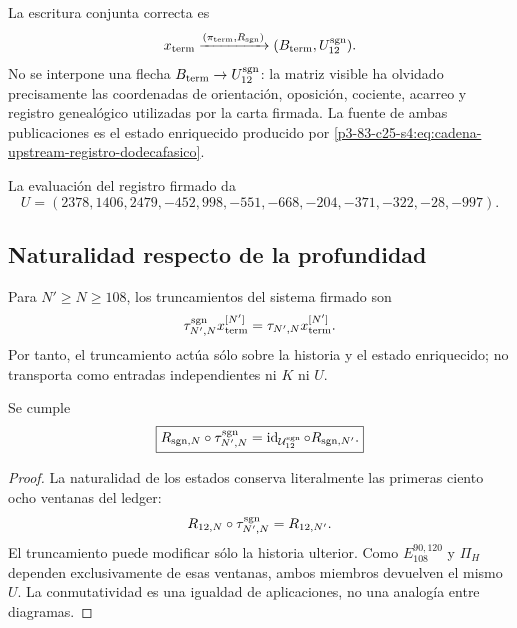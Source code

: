 La escritura conjunta correcta es
\begin{equation}
 x_{\rm term}
 \xrightarrow{(\pi_{\rm term},R_{\rm sgn})}
 (B_{\rm term},U_{12}^{\rm sgn}).
 \label{p3-83-c25-s4:eq:doble-publicacion-terminal}
\end{equation}
No se interpone una flecha
\(B_{\rm term}\to U_{12}^{\rm sgn}\): la matriz visible ha olvidado
precisamente las coordenadas de orientación, oposición, cociente, acarreo y
registro genealógico utilizadas por la carta firmada. La fuente de ambas publicaciones es
el estado enriquecido producido por \eqref{p3-83-c25-s4:eq:cadena-upstream-registro-dodecafasico}.

La evaluación del registro firmado da
\begin{equation}
 \boxed{
 U=(2378,1406,2479,-452,998,-551,
 -668,-204,-371,-322,-28,-997).}
 \label{p3-83-c25-s4:eq:vector-u-firmado-autonomo}
\end{equation}

\subsection{Naturalidad respecto de la profundidad}

Para \(N'\geq N\geq108\), los truncamientos del sistema firmado son
\begin{equation}
 \tau_{N',N}^{\rm sgn}
 x_{\rm term}^{[N']}
 =\tau_{N',N}x_{\rm term}^{[N']}.
 \label{p3-83-c25-s4:eq:truncamiento-preserva-ku-autonomo}
\end{equation}
Por tanto, el truncamiento actúa sólo sobre la historia y el estado
enriquecido; no transporta como entradas independientes ni \(K\) ni \(U\).

\begin{theorem}
\label{p3-83-c25-s4:thm:naturalidad-lector-firmado-autonomo}
Se cumple
\begin{equation}
 \boxed{
 R_{{\rm sgn},N}\circ\tau_{N',N}^{\rm sgn}
 =\operatorname{id}_{\mathcal U_{12}^{\rm sgn}}
  \circ R_{{\rm sgn},N'}.}
 \label{p3-83-c25-s4:eq:cuadrado-naturalidad-lector-firmado}
\end{equation}
\end{theorem}

\begin{proof}
La naturalidad de los estados conserva literalmente las primeras ciento ocho
ventanas del ledger:
\[
 R_{12,N}\circ\tau_{N',N}^{\rm sgn}=R_{12,N'}.
\]
El truncamiento puede modificar sólo la historia ulterior. Como
\(E_{108}^{90,120}\) y \(\Pi_H\) dependen exclusivamente de esas ventanas,
ambos miembros devuelven el mismo \(U\). La conmutatividad es una igualdad de
aplicaciones, no una analogía entre diagramas.
\end{proof}

